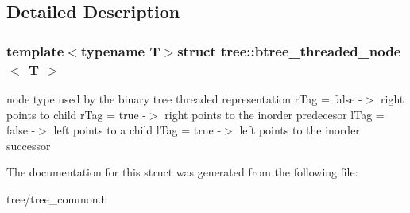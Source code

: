 \subsection{Detailed Description}
\subsubsection*{template$<$typename T$>$struct tree\-::btree\-\_\-threaded\-\_\-node$<$ T $>$}

node type used by the binary tree threaded representation r\-Tag = false -\/$>$ right points to child r\-Tag = true -\/$>$ right points to the inorder predecesor l\-Tag = false -\/$>$ left points to a child l\-Tag = true -\/$>$ left points to the inorder successor 

The documentation for this struct was generated from the following file\-:\begin{DoxyCompactItemize}
\item 
tree/tree\-\_\-common.\-h\end{DoxyCompactItemize}

